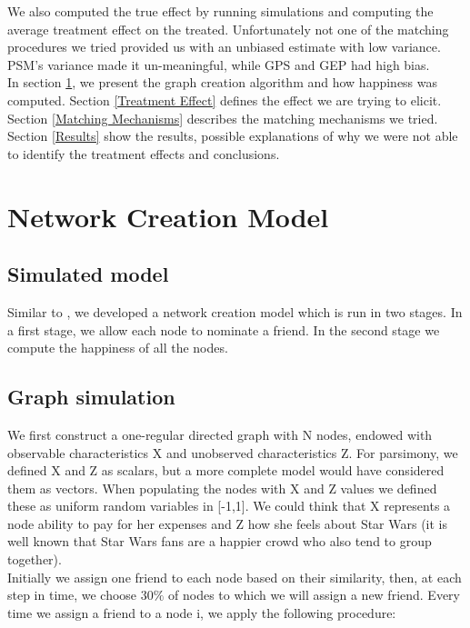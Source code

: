 \documentclass[11pt]{article}
\begin{document}
We also computed the true effect by running simulations and computing the average treatment effect on the treated. Unfortunately not one of the matching procedures we tried provided us with an unbiased estimate with low variance. PSM’s variance made it un-meaningful, while GPS and GEP had high bias.\\

In section \ref{Network Creation Model}, we present the graph creation algorithm and how happiness was computed. Section \ref{Treatment Effect} defines the effect we are trying to elicit. Section \ref{Matching Mechanisms} describes the matching mechanisms we tried. Section \ref{Results} show the results, possible explanations of why we were not able to identify the treatment effects and conclusions.\\

\section{Network Creation Model}
\label{Network Creation Model}

\subsection{Simulated model}

Similar to \cite{shalizi2011homophily}, we developed a network creation model which is run in two stages. In a first stage, we allow each node to nominate a friend. In the second stage we compute the happiness of all the nodes.

\subsection{Graph simulation}

We first construct a one-regular directed graph with N nodes, endowed with observable characteristics X and unobserved characteristics Z. For parsimony, we defined X and Z as scalars, but a more complete model would have considered them as vectors. When populating the nodes with X and Z values we defined these as uniform random variables in [-1,1]. We could think that X represents a node ability to pay for her expenses and Z how she feels about Star Wars (it is well known that Star Wars fans are a happier crowd who also tend to group together). \\

Initially we assign one friend to each node based on their similarity, then, at each step in time, we choose $30\%$ of nodes to which we will assign a new friend. Every time we assign a friend to a node i, we apply the following procedure:
\end{document}

